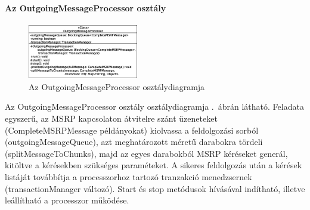 \paragraph{Az OutgoingMessageProcessor osztály\\}
\label{sec:msrp_outgoingprocessor}
\begin{figure}
  \vspace{-15pt}
  \begin{center}
    \includegraphics[width=0.43\textwidth]{img/class_diagrams/OutgoingMessageProcessor.eps}
  \end{center}
  \vspace{-15pt}
  \captionsetup{font=scriptsize}
  \caption{Az OutgoingMessageProcessor osztálydiagramja}
   \label{fig:class_outgoingprocessor}
  \vspace{-10pt}
\end{figure}
Az OutgoingMessageProcessor osztály osztálydiagramja .~ábrán látható. Feladata egyszerű, az MSRP kapcsolaton átvitelre szánt üzeneteket (CompleteMSRPMessage példányokat) kiolvassa a feldolgozási sorból (outgoingMessageQueue), azt meghatározott méretű darabokra tördeli (splitMessageToChunks), majd az egyes darabokból MSRP kéréseket generál, kitöltve a kérésekben szükséges paraméteket. A sikeres feldolgozás után a kérések listáját továbbítja a processzorhoz tartozó tranzakció menedzsernek (transactionManager változó). Start és stop metódusok hívásával indítható, illetve leállítható a processzor működése. 

